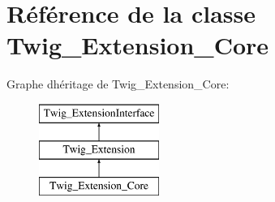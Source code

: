 \hypertarget{class_twig___extension___core}{}\section{Référence de la classe Twig\+\_\+\+Extension\+\_\+\+Core}
\label{class_twig___extension___core}
Graphe d\textquotesingle{}héritage de Twig\+\_\+\+Extension\+\_\+\+Core\+:\begin{figure}[H]
\begin{center}
\leavevmode
\includegraphics[height=3.000000cm]{class_twig___extension___core}
\end{center}
\end{figure}
